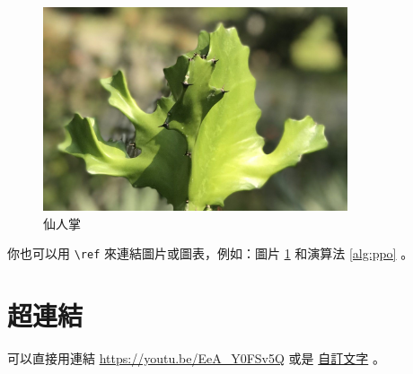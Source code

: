 \documentclass{homework}
\begin{document}
\begin{figure}[htpb]
	\centering
	\includegraphics[width=0.8\textwidth]{files/cactus.jpeg}
	\caption{仙人掌}
	\label{fig:cactus}
\end{figure}

你也可以用 \verb|\ref| 來連結圖片或圖表，例如：圖片 \ref{fig:cactus} 和演算法 \ref{alg:ppo} 。

\section{超連結}

可以直接用連結 \url{https://youtu.be/EeA_Y0FSv5Q} 或是 \href{https://youtu.be/EeA_Y0FSv5Q}{自訂文字} 。
\end{document}
